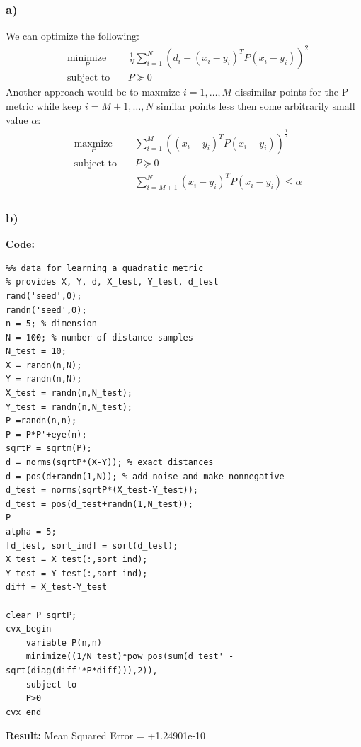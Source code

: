 \documentclass[12pt]{article}
\begin{document}
\subsubsection*{a)}
We can optimize the following:
\begin{equation*}
\begin{aligned}
& \underset{P}{\text{minimize}}
& & \frac{1}{N}\sum_{i=1}^{N}(d_i - (x_i-y_i)^TP(x_i-y_i))^2\\
& \text{subject to}\
& & P \succeq 0
\end{aligned}
\end{equation*}
Another approach would be to maxmize $i=1,\dots,M$ dissimilar points for the P-metric while keep $i=M+1,\dots,N$ similar points less then some arbitrarily small value $\alpha$:
\begin{equation*}
\begin{aligned}
& \underset{P}{\text{maxmize}}
& & \sum_{i=1}^{M}((x_i-y_i)^TP(x_i-y_i))^\frac{1}{2}\\
& \text{subject to}\
& & P \succeq 0\\
& & & \sum_{i=M+1}^{N}(x_i-y_i)^TP(x_i-y_i) \le \alpha
\end{aligned}
\end{equation*}
\subsubsection*{b)}
\textbf{Code:}
\begin{lstlisting}
%% data for learning a quadratic metric
% provides X, Y, d, X_test, Y_test, d_test
rand('seed',0);
randn('seed',0);
n = 5; % dimension
N = 100; % number of distance samples
N_test = 10;
X = randn(n,N);
Y = randn(n,N);
X_test = randn(n,N_test);
Y_test = randn(n,N_test);
P =randn(n,n);
P = P*P'+eye(n);
sqrtP = sqrtm(P);
d = norms(sqrtP*(X-Y)); % exact distances
d = pos(d+randn(1,N)); % add noise and make nonnegative
d_test = norms(sqrtP*(X_test-Y_test));
d_test = pos(d_test+randn(1,N_test));
P
alpha = 5;
[d_test, sort_ind] = sort(d_test);
X_test = X_test(:,sort_ind);
Y_test = Y_test(:,sort_ind);
diff = X_test-Y_test

clear P sqrtP;
cvx_begin
    variable P(n,n)
    minimize((1/N_test)*pow_pos(sum(d_test' - sqrt(diag(diff'*P*diff))),2)),
    subject to
    P>0
cvx_end

\end{lstlisting}
\textbf{Result:}
Mean Squared Error = +1.24901e-10

 
\end{document}

